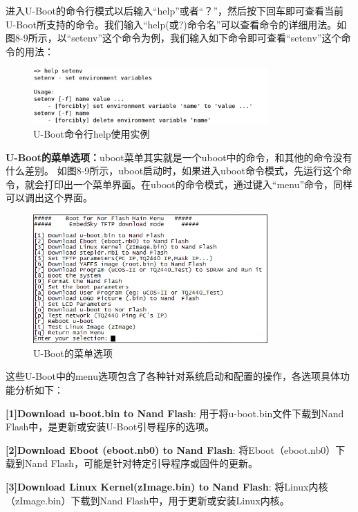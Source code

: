      进入U-Boot的命令行模式以后输入“help”或者“？”，然后按下回车即可查看当前U-Boot所支持的命令。我们输入“help(或?)命令名”可以查看命令的详细用法。如图8-9所示，以“setenv”这个命令为例，我们输入如下命令即可查看“setenv”这个命令的用法：
     
     \begin{figure}[h]
     	\centering
     	\includegraphics[width=0.8\textwidth]{figures/08-01-U-Boot命令行help使用实例.png}
     	\caption{U-Boot命令行help使用实例}
     	\label{U-Boot命令行help使用实例}
     \end{figure}
     
     \textbf{ U-Boot的菜单选项：}uboot菜单其实就是一个uboot中的命令，和其他的命令没有什么差别。 如图8-9所示，uboot启动时，如果进入uboot命令模式，先运行这个命令，就会打印出一个菜单界面。在uboot的命令模式，通过键入“menu”命令，同样可以调出这个界面。
     
    \begin{figure}[h]
    	\centering
    	\includegraphics[width=0.8\textwidth]{figures/08-01-U-Boot的菜单选项.png}
    	\caption{U-Boot的菜单选项}
    	\label{U-Boot的菜单选项}
    \end{figure}
    
    这些U-Boot中的menu选项包含了各种针对系统启动和配置的操作，各选项具体功能分析如下：
    
   \textbf{[1]Download u-boot.bin to Nand Flash}: 用于将u-boot.bin文件下载到Nand Flash中，是更新或安装U-Boot引导程序的选项。
    
    \textbf{[2]Download Eboot (eboot.nb0) to Nand Flash}: 将Eboot（eboot.nb0）下载到Nand Flash，可能是针对特定引导程序或固件的更新。
    
   \textbf{[3]Download Linux Kernel(zImage.bin) to Nand Flash}: 将Linux内核（zImage.bin）下载到Nand Flash中，用于更新或安装Linux内核。
    
